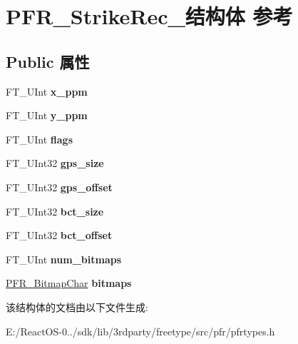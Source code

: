 \hypertarget{struct_p_f_r___strike_rec__}{}\section{P\+F\+R\+\_\+\+Strike\+Rec\+\_\+结构体 参考}
\label{struct_p_f_r___strike_rec__}
\subsection*{Public 属性}
\begin{DoxyCompactItemize}
\item 
\mbox{\label{struct_p_f_r___strike_rec___a392bce3bde29f77de3d0e33078eb89b9}} 
F\+T\+\_\+\+U\+Int {\bfseries x\+\_\+ppm}
\item 
\mbox{\label{struct_p_f_r___strike_rec___ade03eead80d7520ae32d5820341f99b1}} 
F\+T\+\_\+\+U\+Int {\bfseries y\+\_\+ppm}
\item 
\mbox{\label{struct_p_f_r___strike_rec___a4978cd3ba578d22e24827d7733fd5be6}} 
F\+T\+\_\+\+U\+Int {\bfseries flags}
\item 
\mbox{\label{struct_p_f_r___strike_rec___ab2edcd01036cd953cb93cadb6d2c1870}} 
F\+T\+\_\+\+U\+Int32 {\bfseries gps\+\_\+size}
\item 
\mbox{\label{struct_p_f_r___strike_rec___a6dfe98ff7efc1f5493abad52b024d546}} 
F\+T\+\_\+\+U\+Int32 {\bfseries gps\+\_\+offset}
\item 
\mbox{\label{struct_p_f_r___strike_rec___a8a1097ec2913865e841dccdc38a44890}} 
F\+T\+\_\+\+U\+Int32 {\bfseries bct\+\_\+size}
\item 
\mbox{\label{struct_p_f_r___strike_rec___acdbdf669bcc9a1e06370be148ad1c47f}} 
F\+T\+\_\+\+U\+Int32 {\bfseries bct\+\_\+offset}
\item 
\mbox{\label{struct_p_f_r___strike_rec___a099a41bf4a8b776aeb7dec9beb2ad993}} 
F\+T\+\_\+\+U\+Int {\bfseries num\+\_\+bitmaps}
\item 
\mbox{\label{struct_p_f_r___strike_rec___a300ff4329c0e21d3f256554213f6364d}} 
\hyperlink{struct_p_f_r___bitmap_char_rec__}{P\+F\+R\+\_\+\+Bitmap\+Char} {\bfseries bitmaps}
\end{DoxyCompactItemize}


该结构体的文档由以下文件生成\+:\begin{DoxyCompactItemize}
\item 
E\+:/\+React\+O\+S-\/0../sdk/lib/3rdparty/freetype/src/pfr/pfrtypes.\+h\end{DoxyCompactItemize}

